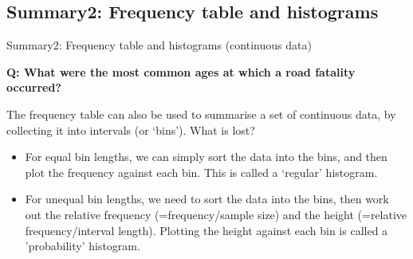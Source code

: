 \documentclass[t,xcolor=pdftex,dvipsnames,table]{beamer}\usepackage[]{graphicx}\usepackage[]{color}
\makeatletter
\def\maxwidth{ %
  \ifdim\Gin@nat@width>\linewidth
    \linewidth
  \else
    \Gin@nat@width
  \fi
}
\newcommand{\hlcom}[1]{\textcolor[rgb]{0.678,0.584,0.686}{\textit{#1}}}%
\newcommand{\hlopt}[1]{\textcolor[rgb]{0,0,0}{#1}}%
\newcommand{\hlstd}[1]{\textcolor[rgb]{0.345,0.345,0.345}{#1}}%
\newcommand{\hlkwb}[1]{\textcolor[rgb]{0.69,0.353,0.396}{#1}}%
\newcommand{\hlkwd}[1]{\textcolor[rgb]{0.737,0.353,0.396}{\textbf{#1}}}%
\newenvironment{kframe}{%
 \def\at@end@of@kframe{}%
 \ifinner\ifhmode%
  \def\at@end@of@kframe{\end{minipage}}%
  \begin{minipage}{\columnwidth}%
 \fi\fi%
 \def\FrameCommand##1{\hskip\@totalleftmargin \hskip-\fboxsep
 \colorbox{shadecolor}{##1}\hskip-\fboxsep
     \hskip-\linewidth \hskip-\@totalleftmargin \hskip\columnwidth}%
 \MakeFramed {\advance\hsize-\width
   \@totalleftmargin\z@ \linewidth\hsize
   \@setminipage}}%
 {\par\unskip\endMakeFramed%
 \at@end@of@kframe}
\newenvironment{knitrout}{}{} %
\makeatother
\begin{document}

\subsection[]{Summary2: Frequency table and histograms}
\begin{frame}[fragile]{Summary2: Frequency table and histograms (continuous data)}

{\bf Q: What were the most common ages at which a road fatality occurred?}

\vspace{.5cm}
The frequency table can also be used to summarise a set of continuous data, by collecting it into intervals (or ‘bins’). What is lost?

\begin{itemize}
\item 
For equal bin lengths, we can simply sort the data into the bins, and then plot the frequency against each bin. This is called a `regular' histogram. 

\item
For unequal bin lengths, we need to sort the data into the bins, then work out the relative frequency (=frequency/sample size) and the height (=relative frequency/interval length). Plotting the height against each bin is called a 'probability' histogram.
\end{itemize}
\end{frame}
\end{document}
